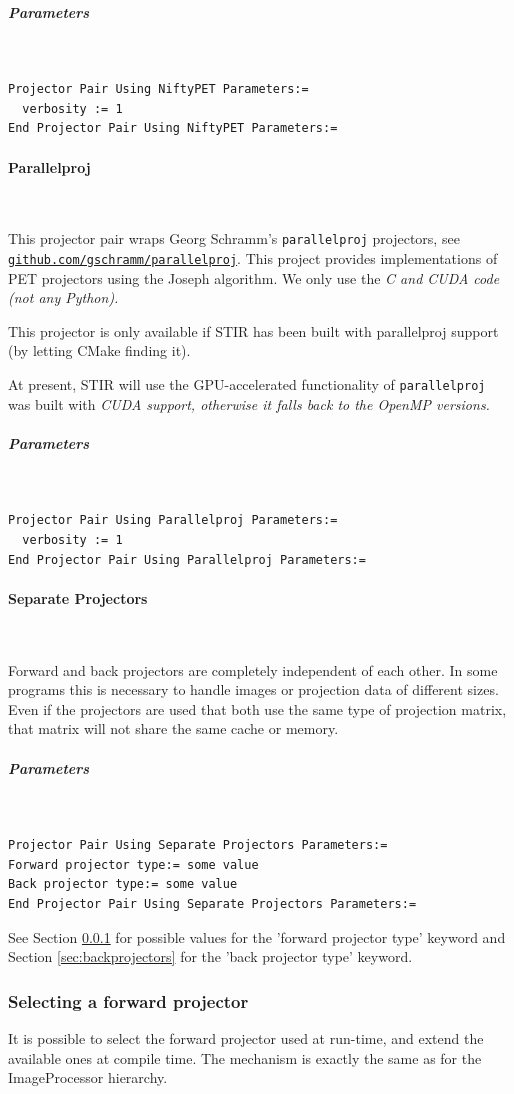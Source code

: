 \documentclass{article}
\def\url#1#2{\mbox{\href{#1}{\tt #2}}}
\newcommand{\subsubsubsection}[1]{\paragraph{#1}\mbox{} \\}
\newcommand{\subsubsubsubsection}[1]{\subparagraph{#1} \mbox{} \\}
\begin{document}
{{{ \subsubsubsubsection{Parameters}
}
\begin{verbatim}
Projector Pair Using NiftyPET Parameters:=
  verbosity := 1
End Projector Pair Using NiftyPET Parameters:=
\end{verbatim}

{ \subsubsubsection{Parallelproj}
\label{sec:projectorpairusingparallelproj}
}
This projector pair wraps Georg Schramm's \texttt{parallelproj} projectors, see
\url{https://github.com/gschramm/parallelproj}{github.com/gschramm/parallelproj}. This project provides implementations
of PET projectors using the Joseph algorithm. We only use the \em{C} and \em{CUDA} code (not any \textit{Python}).

This projector is only available if STIR has been built with parallelproj support (by letting CMake finding it).

At present, STIR will use the GPU-accelerated functionality of \texttt{parallelproj} was
built with \em{CUDA} support, otherwise it falls back to the \em{OpenMP} versions.


{ \subsubsubsubsection{Parameters}
}
\begin{verbatim}
Projector Pair Using Parallelproj Parameters:=
  verbosity := 1
End Projector Pair Using Parallelproj Parameters:=
\end{verbatim}

{ \subsubsubsection{Separate Projectors }
}
Forward and back projectors are completely independent of each 
other. In some programs this is necessary to handle images or 
projection data of different sizes. \\
Even if the projectors are used that both use the same type of 
projection matrix, that matrix will not share the same cache 
or memory.

{ \subsubsubsubsection{Parameters}
}
\begin{verbatim}
Projector Pair Using Separate Projectors Parameters:=
Forward projector type:= some value
Back projector type:= some value
End Projector Pair Using Separate Projectors Parameters:=
\end{verbatim}

See Section \ref{sec:forwardprojectors} for possible values for the 'forward projector 
type' keyword and Section \ref{sec:backprojectors} for the 'back projector type' 
keyword.


\subsubsection{
Selecting a forward projector}
\label{sec:forwardprojectors}
It is possible to select the forward projector used at run-time, 
and extend the available ones at compile time. The mechanism 
is exactly the same as for the ImageProcessor hierarchy.


}}
\end{document}
